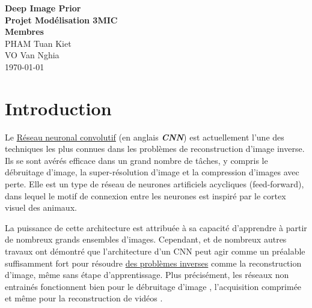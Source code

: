 \documentclass[
  11pt,
  dvipsnames]{article}
\author{}
\date{\vspace{-2.5em}}
\begin{document}
\onehalfspacing


\begin{titlepage}
\vspace*{\fill}
\begin{center}
\LARGE{\textbf{Deep Image Prior}}\\
\Large{\textbf{Projet Modélisation 3MIC}}\\
\vspace*{1\baselineskip}
\Large{\textbf{Membres}}\\
PHAM Tuan Kiet\\
VO Van Nghia\\
\vfill %
\vspace*{\fill}
\today
\end{center}
\end{titlepage}

\newpage

\newpage
{}
\tableofcontents
{}

\listoffigures

\newpage
{}

\hypertarget{introduction}{%
\section{Introduction}\label{introduction}}

Le \protect\hyperlink{ruxe9seau-neuronal-convolutif}{Réseau neuronal convolutif} (en anglais \textbf{\emph{CNN}}) est actuellement l'une des techniques
les plus connues dans les problèmes de reconstruction d'image inverse.
Ils se sont avérés efficace dans un grand nombre de tâches, y compris le débruitage d'image,
la super-résolution d'image et la compression d'images avec perte.
Elle est un type de réseau de neurones artificiels acycliques (feed-forward),
dans lequel le motif de connexion entre les neurones est inspiré
par le cortex visuel des animaux.

La puissance de cette architecture est attribuée à sa capacité d'apprendre
à partir de nombreux grands ensembles d'images.
Cependant, \autocite{2007.02471,1711.10925} et de nombreux autres travaux ont démontré
que l'architecture d'un CNN peut agir comme un préalable suffisamment fort pour résoudre
\protect\hyperlink{les-probluxe8mes-inverses}{des problèmes inverses} comme la reconstruction d'image,
même sans étape d'apprentissage. Plus précisément, les réseaux non entrainés
fonctionnent bien pour le débruitage d'image \autocite{2007.02471},
l'acquisition comprimée \autocite{1806.06438} et même pour la reconstruction de vidéos \autocite{1910.01684}.
\end{document}
